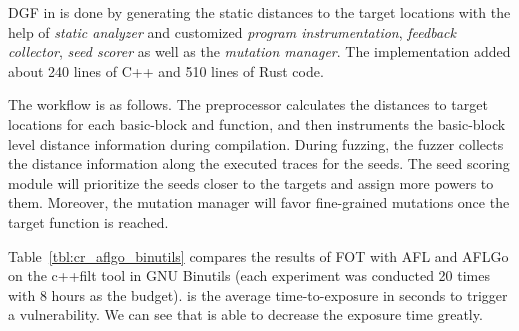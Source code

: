 DGF in {\FOT} is done by generating the static distances to the target locations with the help of \emph{static analyzer} and customized \emph{program instrumentation}, \emph{feedback collector}, \emph{seed scorer} as well as the \emph{mutation manager}. The implementation added about 240 lines of C++ and 510 lines of Rust code.

The workflow is as follows.
The preprocessor calculates the distances to target locations for each basic-block and function, and then instruments the basic-block level distance information during compilation.
During fuzzing, the fuzzer collects the distance information along the executed traces for the seeds.
The seed scoring module will prioritize the seeds closer to the targets and assign more powers to them. 
Moreover, the mutation manager will favor fine-grained mutations once the target function is reached.





Table~\ref{tbl:cr_aflgo_binutils} compares the results of FOT with AFL and AFLGo on the c++filt tool in GNU Binutils (each experiment was conducted 20 times with 8 hours as the budget). {\utte} is the average time-to-exposure in seconds to trigger a vulnerability. We can see that {\dFOT} is able to decrease the exposure time greatly.

